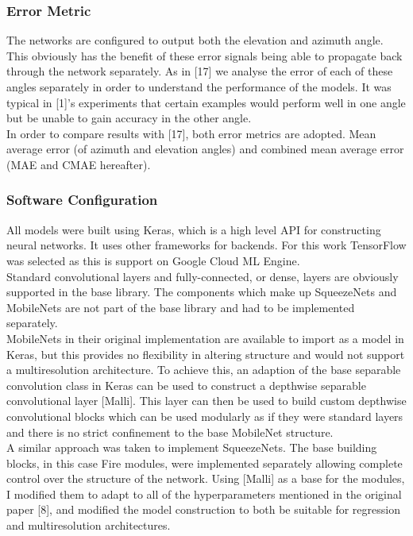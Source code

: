 \documentclass{article}
\begin{document}
\subsubsection{Error Metric}
The networks are configured to output both the elevation and azimuth angle. This obviously has the benefit of these error signals being able to propagate back through the network separately. As in [17] we analyse the error of each of these angles separately in order to understand the performance of the models. It was typical in [1]'s experiments that certain examples would perform well in one angle but be unable to gain accuracy in the other angle.\\

In order to compare results with [17], both error metrics are adopted. Mean average error (of azimuth and elevation angles) and combined mean average error (MAE and CMAE hereafter).

\subsubsection{Software Configuration}
All models were built using Keras, which is a high level API for constructing neural networks. It uses other frameworks for backends. For this work TensorFlow was selected as this is support on Google Cloud ML Engine. \\

Standard convolutional layers and fully-connected, or dense, layers are obviously supported in the base library. The components which make up SqueezeNets and MobileNets are not part of the base library and had to be implemented separately. \\ 

MobileNets in their original implementation are available to import as  a model in Keras, but this provides no flexibility in altering structure and would not support a multiresolution architecture. To achieve this, an adaption of the base separable convolution class in Keras can be used to construct a depthwise separable convolutional layer [Malli]. This layer can then be used to build custom depthwise convolutional blocks which can be used modularly as if they were standard layers and there is no strict confinement to the base MobileNet structure. \\

A similar approach was taken to implement SqueezeNets. The base building blocks, in this case Fire modules, were implemented separately allowing complete control over the structure of the network. Using [Malli] as a base for the modules, I modified them to adapt to all of the hyperparameters mentioned in the original paper [8], and modified the model construction to both be suitable for regression and multiresolution architectures. \\
\end{document}
